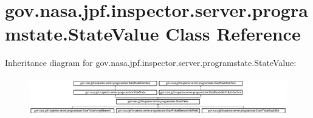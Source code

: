\hypertarget{classgov_1_1nasa_1_1jpf_1_1inspector_1_1server_1_1programstate_1_1_state_value}{}\section{gov.\+nasa.\+jpf.\+inspector.\+server.\+programstate.\+State\+Value Class Reference}
\label{classgov_1_1nasa_1_1jpf_1_1inspector_1_1server_1_1programstate_1_1_state_value}
Inheritance diagram for gov.\+nasa.\+jpf.\+inspector.\+server.\+programstate.\+State\+Value\+:\begin{figure}[H]
\begin{center}
\leavevmode
\includegraphics[height=1.728395cm]{classgov_1_1nasa_1_1jpf_1_1inspector_1_1server_1_1programstate_1_1_state_value}
\end{center}
\end{figure}
